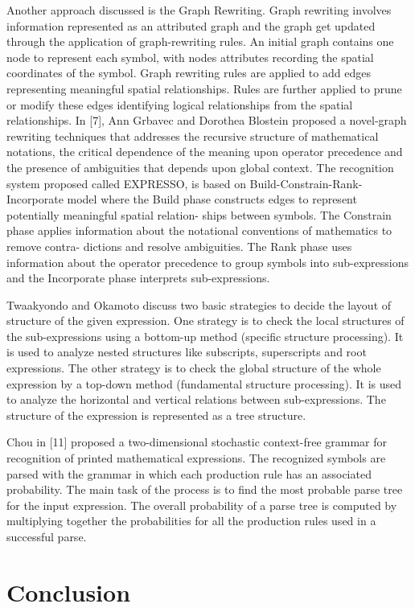 Another approach discussed is the Graph Rewriting. Graph rewriting
involves information represented as an attributed graph and the
graph get updated through the application of graph-rewriting rules.
An initial graph contains one node to represent each symbol, with
nodes attributes recording the spatial coordinates of the symbol.
Graph rewriting rules are applied to add edges representing
meaningful spatial relationships. Rules are further applied to prune
or modify these edges identifying logical relationships from the
spatial relationships. In [7], Ann Grbavec and Dorothea Blostein
proposed a novel-graph rewriting techniques that addresses the
recursive structure of mathematical notations, the critical
dependence of the meaning upon operator precedence and the presence
of ambiguities that depends upon global context. The recognition
system proposed called EXPRESSO, is based on
Build-Constrain-Rank-Incorporate model where the Build phase
constructs edges to represent potentially meaningful spatial
relation- ships between symbols. The Constrain phase applies
information about the notational conventions of mathematics to
remove contra- dictions and resolve ambiguities. The Rank phase uses
information about the operator precedence to group symbols into
sub-expressions and the Incorporate phase interprets
sub-expressions.

Twaakyondo and Okamoto \cite{twaakyondo1995saa} discuss two basic
strategies to decide the layout of structure of the given
expression. One strategy is to check the local structures of the
sub-expressions using a bottom-up method (specific structure
processing). It is used to analyze nested structures like
subscripts, superscripts and root expressions. The other strategy is
to check the global structure of the whole expression by a top-down
method (fundamental structure processing). It is used to analyze the
horizontal and vertical relations between sub-expressions. The
structure of the expression is represented as a tree structure.

Chou in [11] proposed a two-dimensional stochastic context-free
grammar for recognition of printed mathematical expressions. The
recognized symbols are parsed with the grammar in which each
production rule has an associated probability. The main task of the
process is to find the most probable parse tree for the input
expression. The overall probability of a parse tree is computed by
multiplying together the probabilities for all the production rules
used in a successful parse.

\section{Conclusion}
%

